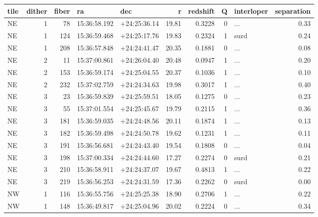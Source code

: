\begin{tabular}{lrrllrrrlr}
\toprule
tile &  dither &  fiber &            ra &           dec &      r &  redshift &  Q & interloper &  separation \\
\midrule
  NE &       1 &     78 &  15:36:58.192 &  +24:25:36.14 &  19.81 &    0.3228 &  0 &        ... &        0.33 \\
  NE &       1 &    124 &  15:36:59.468 &  +24:25:17.76 &  19.83 &    0.2324 &  1 &       surd &        0.24 \\
  NE &       1 &    208 &  15:36:57.848 &  +24:24:41.47 &  20.35 &    0.1881 &  0 &        ... &        0.08 \\
  NE &       2 &     11 &  15:37:00.861 &  +24:26:04.40 &  20.48 &    0.0947 &  1 &        ... &        0.20 \\
  NE &       2 &    153 &  15:36:59.174 &  +24:25:04.55 &  20.37 &    0.1036 &  1 &        ... &        0.10 \\
  NE &       2 &    232 &  15:37:02.759 &  +24:24:34.63 &  19.98 &    0.3017 &  1 &        ... &        0.40 \\
  NE &       3 &     23 &  15:36:59.839 &  +24:25:59.51 &  18.05 &    0.1275 &  0 &        ... &        0.23 \\
  NE &       3 &     55 &  15:37:01.554 &  +24:25:45.67 &  19.79 &    0.2115 &  1 &        ... &        0.36 \\
  NE &       3 &    181 &  15:36:59.035 &  +24:24:48.56 &  20.11 &    0.1874 &  1 &        ... &        0.13 \\
  NE &       3 &    182 &  15:36:59.498 &  +24:24:50.78 &  19.62 &    0.1231 &  1 &        ... &        0.11 \\
  NE &       3 &    191 &  15:36:56.681 &  +24:24:43.40 &  19.54 &    0.1808 &  0 &        ... &        0.04 \\
  NE &       3 &    198 &  15:37:00.334 &  +24:24:44.60 &  17.27 &    0.2274 &  0 &       surd &        0.21 \\
  NE &       3 &    210 &  15:36:58.911 &  +24:24:37.07 &  19.67 &    0.4813 &  1 &        ... &        0.22 \\
  NE &       3 &    219 &  15:36:56.253 &  +24:24:31.59 &  17.36 &    0.2262 &  0 &       surd &        0.00 \\
  NW &       1 &    116 &  15:36:55.756 &  +24:25:25.38 &  18.90 &    0.2706 &  1 &        ... &        0.22 \\
  NW &       1 &    148 &  15:36:49.817 &  +24:25:04.96 &  20.02 &    0.2224 &  0 &        ... &        0.34 \\

\end{tabular}
